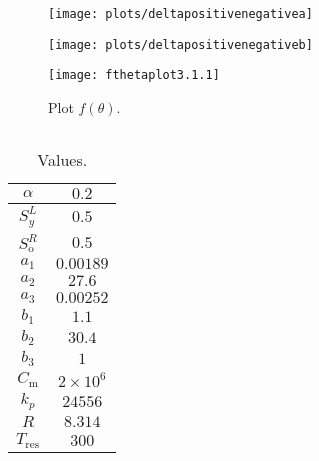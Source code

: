 \documentclass[
    8pt,
    aspectratio=1610,
    c,
    intlimits,
    leqno,
    professionalfonts,
]{beamer}
\begin{document}
\begin{frame}
	\begin{figure}[ht!]
		\centering
		\texttt{[image: plots/deltapositivenegativea]}
	\end{figure}
\end{frame}

\begin{frame}
	\begin{figure}[ht!]
		\centering
		\texttt{[image: plots/deltapositivenegativeb]}
	\end{figure}
\end{frame}

\begin{frame}
	\begin{figure}[ht!]
		\centering
		\texttt{[image: fthetaplot3.1.1]}
		\caption{Plot $f\left(\theta\right)$.}
	\end{figure}
\end{frame}

\begin{frame}[fragile]
	\begin{columns}
		\begin{column}{0.51\textwidth}
			\begin{table}[ht!]
				\begin{tabular}{cc}
					\hline
					$\alpha$           & $0.2$            \\
					\hline
					$S^{L}_{y}$        & $0.5$            \\
					\hline
					$S^{R}_{\text{o}}$ & $0.5$            \\
					\hline
					$a_{1}$            & $0.00189$        \\
					\hline
					$a_{2}$            & $27.6$           \\
					\hline
					$a_{3}$            & $0.00252$        \\
					\hline
					$b_{1}$            & $1.1$            \\
					\hline
					$b_{2}$            & $30.4$           \\
					\hline
					$b_{3}$            & $1$              \\
					\hline
					$C_{\text{m}}$     & $2\times 10^{6}$ \\
					\hline
					$k_{p}$            & $24556$          \\
					\hline
					$R$                & $8.314$          \\
					\hline
					$T_{\text{res}}$   & $300$            \\
					\hline
				\end{tabular}
				\caption{Values.}
			\end{table}
		\end{column}
		\begin{column}{0.45\textwidth}
			\inputminted[fontsize=\tiny]{text}{calculations.txt}
		\end{column}
	\end{columns}
\end{frame}
\end{document}
